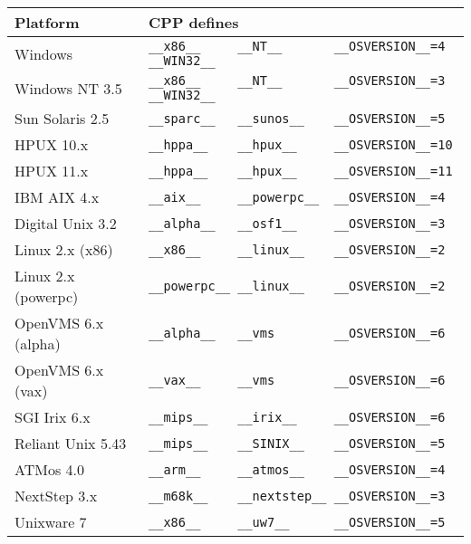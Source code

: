 \documentclass[11pt,twoside,a4paper]{book}
\begin{document}
\begin{flushleft}
\begin{tabular}{|l|l|}
\hline
Platform            & CPP defines \\
\hline
Windows             & \verb|__x86__     __NT__       __OSVERSION__=4  __WIN32__| \\

Windows NT 3.5      & \verb|__x86__     __NT__       __OSVERSION__=3  __WIN32__| \\

Sun Solaris 2.5     & \verb|__sparc__   __sunos__    __OSVERSION__=5| \\

HPUX 10.x           & \verb|__hppa__    __hpux__     __OSVERSION__=10| \\

HPUX 11.x           & \verb|__hppa__    __hpux__     __OSVERSION__=11| \\

IBM AIX 4.x         & \verb|__aix__     __powerpc__  __OSVERSION__=4| \\

Digital Unix 3.2    & \verb|__alpha__   __osf1__     __OSVERSION__=3| \\

Linux 2.x (x86)     & \verb|__x86__     __linux__    __OSVERSION__=2| \\

Linux 2.x (powerpc) & \verb|__powerpc__ __linux__    __OSVERSION__=2| \\

OpenVMS 6.x (alpha) & \verb|__alpha__   __vms        __OSVERSION__=6 | \\

OpenVMS 6.x (vax)   & \verb|__vax__     __vms        __OSVERSION__=6 | \\

SGI Irix 6.x        & \verb|__mips__    __irix__     __OSVERSION__=6 | \\

Reliant Unix 5.43   & \verb|__mips__    __SINIX__    __OSVERSION__=5 | \\

ATMos 4.0           & \verb|__arm__     __atmos__    __OSVERSION__=4| \\

NextStep 3.x        & \verb|__m68k__    __nextstep__ __OSVERSION__=3| \\

Unixware 7          & \verb|__x86__     __uw7__      __OSVERSION__=5| \\
\hline
\end{tabular}
\end{flushleft}
\end{document}

